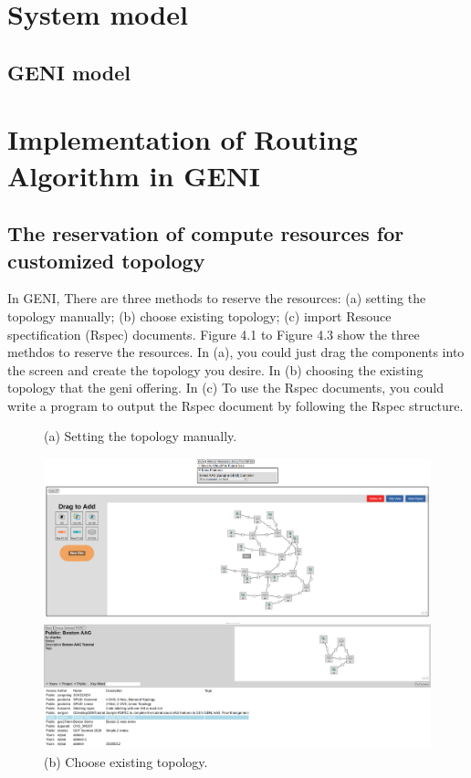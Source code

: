 \documentclass[a4paper,12pt]{report}
\begin{document}
\begin{large}
  \chapter{System model}
     \section{GENI model}
  \chapter{Implementation of Routing Algorithm in GENI}
  	\section{The reservation of compute resources for customized topology}
		\qquad In GENI, There are three methods to reserve the resources: (a) setting the topology manually; (b) choose existing topology; (c) import Resouce spectification (Rspec) documents. Figure 4.1 to Figure 4.3 show the three methdos to reserve the resources. In (a), you could just drag the components into the screen and create the topology you desire. In (b) choosing the existing topology that the geni offering. In (c) To use the Rspec documents, you could write a program to output the Rspec document by following the Rspec structure.
		\begin{figure}
          \caption{(a) Setting the topology manually.}
          \centering
            \includegraphics[width=1.0\textwidth]{geni_manual.png}
          \caption{(b) Choose existing topology.}
            \includegraphics[width=1.0\textwidth]{choose_existing.png}

\end{figure}
\end{large}
\end{document}
